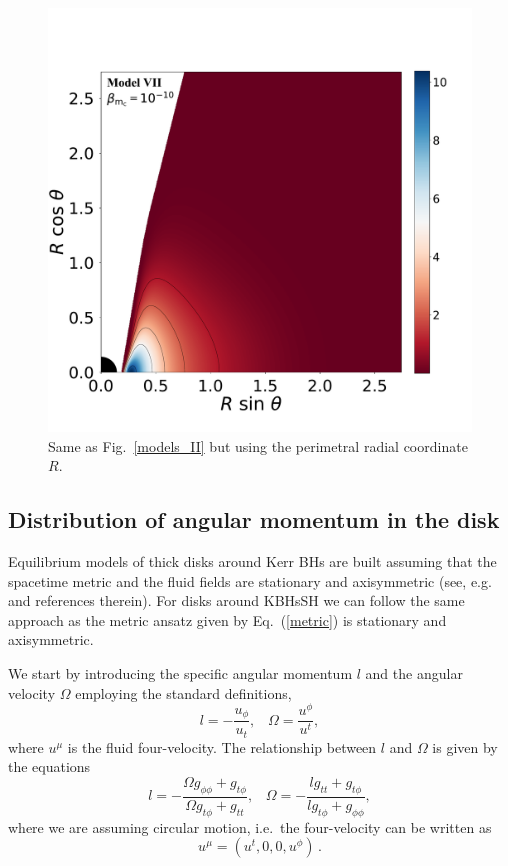 \documentclass[twocolumn,aps,showpacs,showkeys,prd,superscriptaddress,byrevtex, amsmath]{revtex4-1}
\begin{document}
\begin{figure}
\hspace{-0.2cm}
\includegraphics[scale=0.14]{figures/fig4_VII__10.pdf}
\hspace{-0.2cm}
\caption{Same as Fig.~\ref{models_II} but using the perimetral radial coordinate $R$.}
\label{models_peri_II}
\end{figure}

\subsection{Distribution of angular momentum in the disk}

Equilibrium models of thick disks around Kerr BHs are built assuming that the spacetime metric and the fluid fields are stationary and  axisymmetric (see, e.g.~\cite{Font:2002,Daigne:2004,Gimeno-Soler:2017} and references therein). For disks around KBHsSH we can follow the same approach as the metric ansatz given by Eq.~(\ref{metric}) is stationary and axisymmetric.

We start by introducing the specific angular momentum $l$ and the angular velocity $\Omega$ employing the standard definitions,
\begin{equation}
l = - \frac{u_{\phi}}{u_t}, \;\;\; \Omega = \frac{u^{\phi}}{u^t},
\end{equation}
where $u^{\mu}$ is the fluid four-velocity.
The relationship between $l$ and $\Omega$ is given by the equations
\begin{equation}
l = - \frac{\Omega g_{\phi\phi} + g_{t\phi}}{\Omega g_{t\phi} + g_{tt}}, \;\;\; \Omega = - \frac{l g_{tt} + g_{t\phi}}{l g_{t\phi} + g_{\phi\phi}},
\end{equation}
where we are assuming circular motion, i.e.~the four-velocity can be written as
\begin{equation}
u^{\mu} = (u^t, 0, 0, u^{\phi})\,.
\end{equation}
\end{document}
